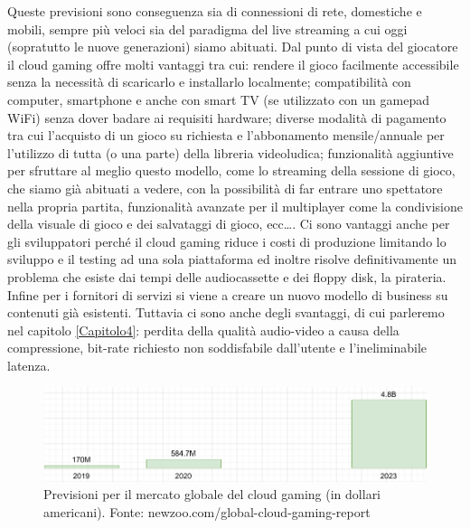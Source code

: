 Queste previsioni sono conseguenza sia di connessioni di rete, domestiche e mobili, sempre più veloci sia del paradigma del live streaming a cui oggi (sopratutto le nuove generazioni) siamo abituati. Dal punto di vista del giocatore il cloud gaming offre molti vantaggi tra cui: rendere il gioco facilmente accessibile senza la necessità di scaricarlo e installarlo localmente; compatibilità con computer, smartphone e anche con smart TV (se utilizzato con un gamepad WiFi) senza dover badare ai requisiti hardware; diverse modalità di pagamento tra cui l'acquisto di un gioco su richiesta e l'abbonamento mensile/annuale per l'utilizzo di tutta (o una parte) della libreria videoludica; funzionalità aggiuntive per sfruttare al meglio questo modello, come lo streaming della sessione di gioco, che siamo già abituati a vedere, con la possibilità di far entrare uno spettatore nella propria partita, funzionalità avanzate per il multiplayer come la condivisione della visuale di gioco e dei salvataggi di gioco, ecc\dots. Ci sono vantaggi anche per gli sviluppatori perché il cloud gaming riduce i costi di produzione limitando lo sviluppo e il testing ad una sola piattaforma ed inoltre risolve definitivamente un problema che esiste dai tempi delle audiocassette e dei floppy disk, la pirateria. Infine per i fornitori di servizi si viene a creare un nuovo modello di business su contenuti già esistenti. Tuttavia ci sono anche degli svantaggi, di cui parleremo nel capitolo \ref{Capitolo4}: perdita della qualità audio-video a causa della compressione, bit-rate richiesto non soddisfabile dall'utente e l'ineliminabile latenza.

\begin{figure}[H]
	\includegraphics[width=\linewidth]{immagini/Newzoo_Cloud_Gaming_Revenues}
	\caption{Previsioni per il mercato globale del cloud gaming (in dollari americani). Fonte: newzoo.com/global-cloud-gaming-report}
	\label{fig:Newzoo_Cloud_Gaming_Revenues}
\end{figure}